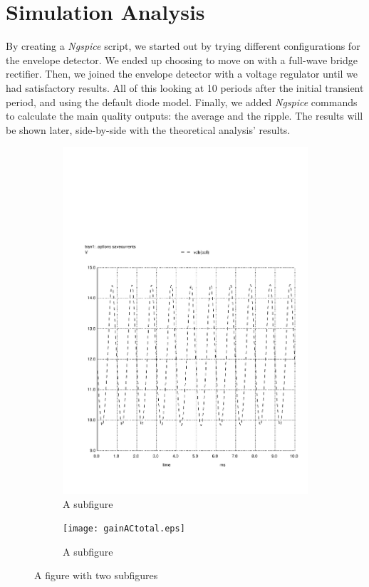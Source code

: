 \section{Simulation Analysis}
\label{sec:simulation}

By creating a \textit{Ngspice} script, we started out by trying different configurations for the envelope detector. We ended up choosing to move on with a full-wave bridge rectifier.
Then, we joined the envelope detector with a voltage regulator until we had satisfactory results. All of this looking at 10 periods after the initial transient period, and using the default diode model.
Finally, we added \textit{Ngspice} commands to calculate the main quality outputs: the average and the ripple. The results will be shown later, side-by-side with the theoretical analysis' results.



\begin{figure}
    \centering
    \begin{subfigure}{.5\textwidth}
        \centering
        \includegraphics[width=.4\linewidth]{vo1.pdf}
        \caption{A subfigure}
        \label{fig:sub1}
    \end{subfigure}%
    \begin{subfigure}{.5\textwidth}
        \centering
        \texttt{[image: gainACtotal.eps]}
        \caption{A subfigure}
        \label{fig:sub2}
    \end{subfigure}
    \caption{A figure with two subfigures}
    \label{fig:test}
\end{figure}


